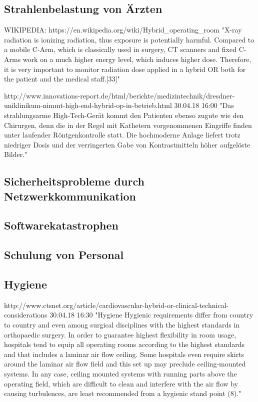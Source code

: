 \subsection{Strahlenbelastung von Ärzten}
WIKIPEDIA: https://en.wikipedia.org/wiki/Hybrid_operating_room
	"X-ray radiation is ionizing radiation, thus exposure is potentially harmful. Compared to a mobile C-Arm, which is classically used in surgery, CT scanners and fixed C-Arms work on a much higher energy level, which induces higher dose. Therefore, it is very important to monitor radiation dose applied in a hybrid OR both for the patient and the medical staff.[33]"
	
http://www.innovations-report.de/html/berichte/medizintechnik/dresdner-uniklinikum-nimmt-high-end-hybrid-op-in-betrieb.html	 30.04.18 16:00
	"Das strahlungsarme High-Tech-Gerät kommt den Patienten ebenso zugute wie den Chirurgen, denn die in der Regel mit Kathetern vorgenommenen Eingriffe finden unter laufender Röntgenkontrolle statt. Die hochmoderne Anlage liefert trotz niedriger Dosis und der verringerten Gabe von Kontrastmitteln höher aufgelöste Bilder."
\subsection{Sicherheitsprobleme durch Netzwerkkommunikation}
\subsection{Softwarekatastrophen}
\subsection{Schulung von Personal}
\subsection{Hygiene}
http://www.ctsnet.org/article/cardiovascular-hybrid-or-clinical-technical-considerations 30.04.18 16:30
	"Hygiene
	Hygienic requirements differ from country to country and even among surgical disciplines with the highest standards in orthopaedic surgery. In order to guarantee highest flexibility in room usage, hospitals tend to equip all operating rooms according to the highest standards and that includes a laminar air flow ceiling. Some hospitals even require skirts around the laminar air flow field and this set up may preclude ceiling-mounted systems. In any case, ceiling mounted systems with running parts above the operating field, which are difficult to clean and interfere with the air flow by causing turbulences, are least recommended from a hygienic stand point (8)."
	
